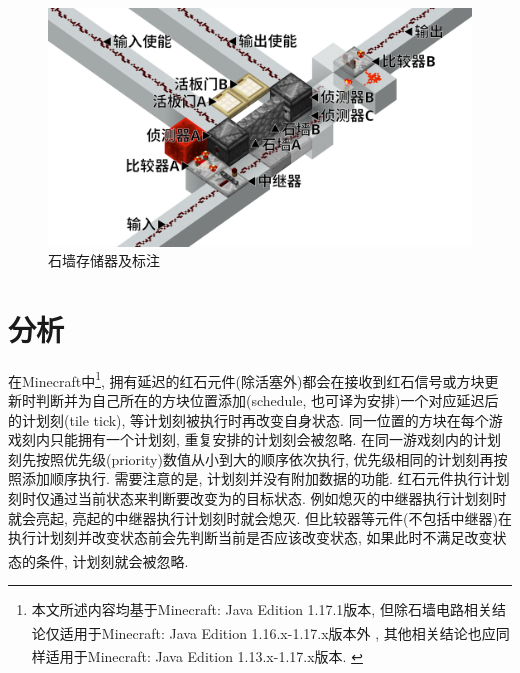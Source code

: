 \documentclass[UTF8,12pt,punct=kaiming,fontset=none]{ctexart}
\newcommand*{\upcite}[1]{
    \textsuperscript{\cite{#1}}
}
\begin{document}
\begin{figure}[H]
    \centering
    \includegraphics[width=0.75\linewidth]{figures/wall-based-storage-2.png}
    \caption{石墙存储器及标注}
    \label{fig:wall-based-storage-marked}
\end{figure}

\section{分析}
在Minecraft中\footnote{本文所述内容均基于Minecraft: Java Edition 1.17.1版本, 但除石墙电路相关结论仅适用于Minecraft: Java Edition 1.16.x-1.17.x版本外\upcite{bib:wall}, 其他相关结论也应同样适用于Minecraft: Java Edition 1.13.x-1.17.x版本.\upcite{bib:tile-tick}}, 拥有延迟的红石元件(除活塞外)都会在接收到红石信号或方块更新时判断并为自己所在的方块位置添加(schedule, 也可译为安排)一个对应延迟后的计划刻(tile tick), 等计划刻被执行时再改变自身状态. 同一位置的方块在每个游戏刻内只能拥有一个计划刻, 重复安排的计划刻会被忽略. 在同一游戏刻内的计划刻先按照优先级(priority)数值从小到大的顺序依次执行, 优先级相同的计划刻再按照添加顺序执行. 需要注意的是, 计划刻并没有附加数据的功能. 红石元件执行计划刻时仅通过当前状态来判断要改变为的目标状态. 例如熄灭的中继器执行计划刻时就会亮起, 亮起的中继器执行计划刻时就会熄灭. 但比较器等元件(不包括中继器)在执行计划刻并改变状态前会先判断当前是否应该改变状态, 如果此时不满足改变状态的条件, 计划刻就会被忽略.\upcite{bib:tile-tick-component}\upcite{bib:yarn}
\end{document}
